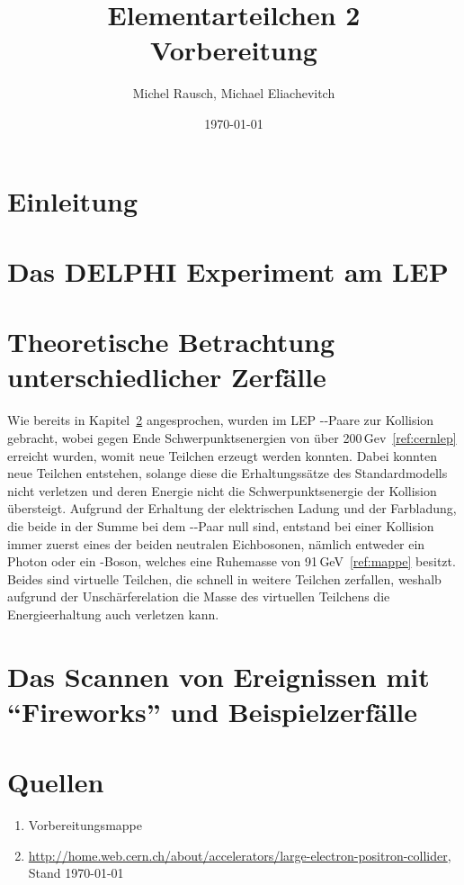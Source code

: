 \documentclass[a4paper,ngerman]{scrartcl}
\title{Elementarteilchen 2\\Vorbereitung}
\date{\today}
\author{Michel Rausch, Michael Eliachevitch}
\begin{document}
\maketitle
\tableofcontents
\newpage

\section{Einleitung}

\section{Das DELPHI Experiment am LEP}
\label{sec:delphi}


\section{Theoretische Betrachtung unterschiedlicher Zerfälle}
\label{sec:zerfaelle}

Wie bereits in Kapitel~\ref{sec:delphi} angesprochen, wurden im LEP \Pelectron-\APelectron-Paare zur Kollision gebracht, wobei gegen Ende Schwerpunktsenergien von über 200\,Gev~\ref{ref:cernlep} erreicht wurden,
womit neue Teilchen erzeugt werden konnten.
Dabei konnten neue Teilchen entstehen, 
solange diese die Erhaltungssätze des Standardmodells nicht verletzen 
und deren Energie nicht die Schwerpunktsenergie der Kollision übersteigt.
Aufgrund der Erhaltung der elektrischen Ladung und der Farbladung, 
die beide in der Summe bei dem \Pelectron-\APelectron-Paar null sind,
entstand bei einer Kollision immer zuerst eines der beiden neutralen Eichbosonen,
nämlich entweder ein Photon oder ein \PZzero-Boson,
welches eine Ruhemasse von 91\,GeV~\ref{ref:mappe} besitzt.
Beides sind virtuelle Teilchen, die schnell in weitere Teilchen zerfallen,
weshalb aufgrund der Unschärferelation die Masse des virtuellen Teilchens die Energieerhaltung auch verletzen kann.




\section{Das Scannen von Ereignissen mit "`Fireworks"' und Beispielzerfälle}
\label{sec:scannen}

\section{Quellen}
\begin{enumerate}
\item Vorbereitungsmappe \label{ref:mappe}
\item \url{http://home.web.cern.ch/about/accelerators/large-electron-positron-collider}, Stand \today \label{ref:cernlep}
\end{enumerate}
\end{document}
